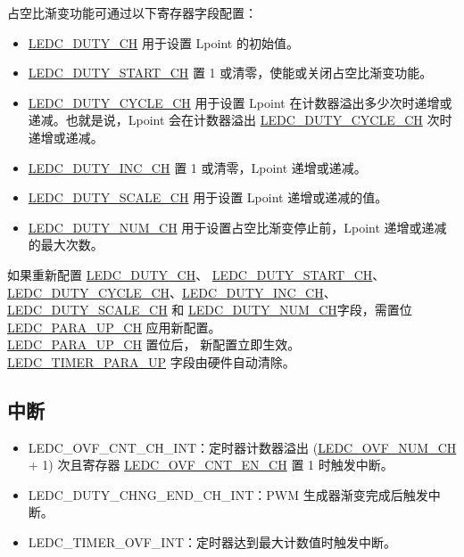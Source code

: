 \documentclass[main\_\_CN.tex]{subfiles}
\begin{document}
占空比渐变功能可通过以下寄存器字段配置：
\begin{itemize}
    \item \hyperref[fielddesc:LEDCDUTYCHN]{LEDC\_DUTY\_CH} 用于设置 Lpoint 的初始值。
    \item \hyperref[fielddesc:LEDCDUTYSTARTCHN]{LEDC\_DUTY\_START\_CH} 置 1 或清零，使能或关闭占空比渐变功能。
    \item \hyperref[fielddesc:LEDCDUTYCYCLECHN]{LEDC\_DUTY\_CYCLE\_CH} 用于设置 Lpoint 在计数器溢出多少次时递增或递减。也就是说，Lpoint 会在计数器溢出 \hyperref[fielddesc:LEDCDUTYCYCLECHN]{LEDC\_DUTY\_CYCLE\_CH} 次时递增或递减。
    \item \hyperref[fielddesc:LEDCDUTYINCCHN]{LEDC\_DUTY\_INC\_CH} 置 1 或清零，Lpoint 递增或递减。
    \item \hyperref[fielddesc:LEDCDUTYSCALECHN]{LEDC\_DUTY\_SCALE\_CH} 用于设置 Lpoint 递增或递减的值。
    \item \hyperref[fielddesc:LEDCDUTYNUMCHN]{LEDC\_DUTY\_NUM\_CH} 用于设置占空比渐变停止前，Lpoint 递增或递减的最大次数。
\end{itemize}

如果重新配置 \hyperref[fielddesc:LEDCDUTYCHN]{LEDC\_DUTY\_CH}、 \hyperref[fielddesc:LEDCDUTYSTARTCHN]{LEDC\_DUTY\_START\_CH}、\hyperref[fielddesc:LEDCDUTYCYCLECHN]{LEDC\_DUTY\_CYCLE\_CH}、\hyperref[fielddesc:LEDCDUTYINCCHN]{LEDC\_DUTY\_INC\_CH}、\hyperref[fielddesc:LEDCDUTYSCALECHN]{LEDC\_DUTY\_SCALE\_CH} 和 \hyperref[fielddesc:LEDCDUTYNUMCHN]{LEDC\_DUTY\_NUM\_CH}字段，需置位 \hyperref[fielddesc:LEDCPARAUPCHN]{LEDC\_PARA\_UP\_CH} 应用新配置。\\\hyperref[fielddesc:LEDCPARAUPCHN]{LEDC\_PARA\_UP\_CH} 置位后，
新配置立即生效。\hyperref[fielddesc:LEDCTIMERXPARAUP]{LEDC\_TIMER\_PARA\_UP} 字段由硬件自动清除。

\subsection{中断}
\begin{itemize}
\item \label{int:ledc-ovf-cnt}LEDC\_OVF\_CNT\_CH\_INT：定时器计数器溢出 (\hyperref[fielddesc:LEDCOVFNUMCHN]{LEDC\_OVF\_NUM\_CH} + 1) 次且寄存器 \hyperref[fielddesc:LEDCOVFCNTENCHN]{LEDC\_OVF\_CNT\_EN\_CH} 置 1 时触发中断。
\item \label{int:ledc-duty-chng-end}LEDC\_DUTY\_CHNG\_END\_CH\_INT：PWM 生成器渐变完成后触发中断。
\item \label{int:ledc-timer-ovf}LEDC\_TIMER\_OVF\_INT：定时器达到最大计数值时触发中断。
\end{itemize}
\end{document}

